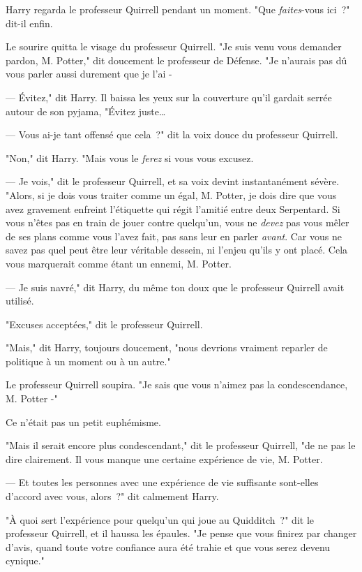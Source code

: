 Harry regarda le professeur Quirrell pendant un moment. "Que \emph{faites}-vous ici~?" dit-il enfin.

Le sourire quitta le visage du professeur Quirrell. "Je suis venu vous demander pardon, M. Potter," dit doucement le professeur de Défense. "Je n'aurais pas dû vous parler aussi durement que je l'ai -

--- Évitez," dit Harry. Il baissa les yeux sur la couverture qu'il gardait serrée autour de son pyjama, "Évitez juste…

--- Vous ai-je tant offensé que cela~?" dit la voix douce du professeur Quirrell.

"Non," dit Harry. "Mais vous le \emph{ferez} si vous vous excusez.

--- Je vois," dit le professeur Quirrell, et sa voix devint instantanément sévère. "Alors, si je dois vous traiter comme un égal, M. Potter, je dois dire que vous avez gravement enfreint l'étiquette qui régit l'amitié entre deux Serpentard. Si vous n'êtes pas en train de jouer contre quelqu'un, vous ne \emph{devez} pas vous mêler de ses plans comme vous l'avez fait, pas sans leur en parler \emph{avant}. Car vous ne savez pas quel peut être leur véritable dessein, ni l'enjeu qu'ils y ont placé. Cela vous marquerait comme étant un ennemi, M. Potter.

--- Je suis navré," dit Harry, du même ton doux que le professeur Quirrell avait utilisé.

"Excuses acceptées," dit le professeur Quirrell.

"Mais," dit Harry, toujours doucement, "nous devrions vraiment reparler de politique à un moment ou à un autre."

Le professeur Quirrell soupira. "Je sais que vous n'aimez pas la condescendance, M. Potter -"

Ce n'était pas un petit euphémisme.

"Mais il serait encore plus condescendant," dit le professeur Quirrell, "de ne pas le dire clairement. Il vous manque une certaine expérience de vie, M. Potter.

--- Et toutes les personnes avec une expérience de vie suffisante sont-elles d'accord avec vous, alors~?" dit calmement Harry.

"À quoi sert l'expérience pour quelqu'un qui joue au Quidditch~?" dit le professeur Quirrell, et il haussa les épaules. "Je pense que vous finirez par changer d'avis, quand toute votre confiance aura été trahie et que vous serez devenu cynique."

